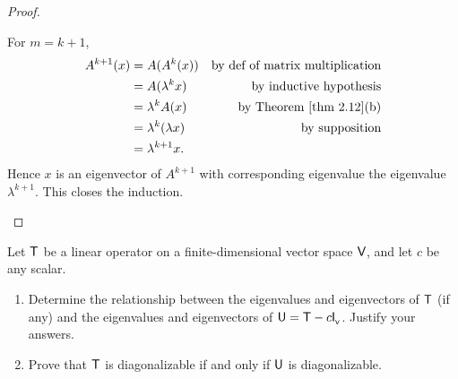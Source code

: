 \begin{proof}
\begin{enumerate}
For \(m = k + 1\),
\begin{align*}
    A^{k + 1}(x) & = A(A^k(x)) & \text{by def of matrix multiplication} \\
            & = A(\lambda^k x) & \text{by inductive hypothesis} \\
            & = \lambda^k A(x) & \text{by \THM{2.12}(b)} \\
            & = \lambda^k (\lambda x) & \text{by supposition} \\
            & = \lambda^{k + 1} x.
\end{align*}
Hence \(x\) is an eigenvector of \(A^{k + 1}\) with corresponding eigenvalue the eigenvalue \(\lambda^{k + 1}\).
This closes the induction.
\end{enumerate}
\end{proof}

\begin{exercise} \label{exercise 5.1.17}
Let \(\textsf{T}\) be a linear operator on a finite-dimensional vector space \(\textsf{V}\), and let \(c\) be any scalar.
\begin{enumerate}
\item Determine the relationship between the eigenvalues and eigenvectors of \(\textsf{T}\) (if any) and the eigenvalues and eigenvectors of \(\textsf{U} = \textsf{T} - c \textsf{I}_{_{\textsf{V}}}{}\).
Justify your answers.
\item Prove that \(\textsf{T}\) is diagonalizable if and only if \(\textsf{U}\) is diagonalizable.
\end{enumerate}
\end{exercise}

